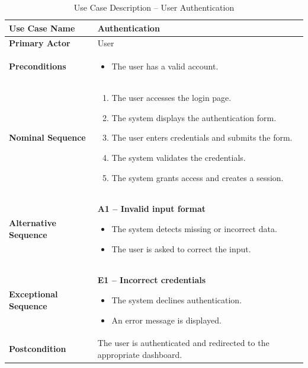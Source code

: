 \begin{table}[H]
	\centering
	\renewcommand{\arraystretch}{1.3}
	\begin{tabular}{|p{4cm}|p{10cm}|}
		\hline
		
		\textbf{Use Case Name} & Authentication \\ 
		\hline
		
		\textbf{Primary Actor} & User\\ 
		\hline
		
		\textbf{Preconditions} &
		\begin{itemize}
			\item The user has a valid account.
		\end{itemize} \\ 
		\hline
		
		\textbf{Nominal Sequence} &
		\begin{enumerate}
			\item The user accesses the login page.
			\item The system displays the authentication form.
			\item The user enters credentials and submits the form.
			\item The system validates the credentials.
			\item The system grants access and creates a session.
		\end{enumerate} \\ 
		\hline
		
		\textbf{Alternative Sequence} &
		\textbf{A1 -- Invalid input format}
		\begin{itemize}
			\item The system detects missing or incorrect data.
			\item The user is asked to correct the input.
		\end{itemize} \\ 
		\hline
		
		\textbf{Exceptional Sequence} &
		\textbf{E1 -- Incorrect credentials}
		\begin{itemize}
			\item The system declines authentication.
			\item An error message is displayed.
		\end{itemize} \\ 
		\hline
		
		\textbf{Postcondition} &
		The user is authenticated and redirected to the appropriate dashboard. \\ 
		\hline
		
	\end{tabular}
	\caption{Use Case Description -- User Authentication}
\end{table}

